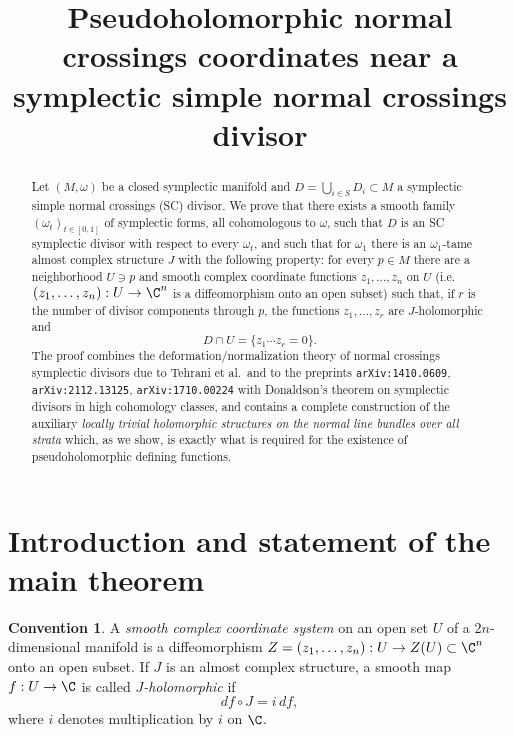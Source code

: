 \documentclass[11pt]{amsart}
\theoremstyle{plain}
\theoremstyle{definition}
\newtheorem{convention}[theorem]{Convention}
\begin{document}
\title{Pseudoholomorphic normal crossings coordinates near a
symplectic simple normal crossings divisor}

\author{}
\date{}

\maketitle

\begin{abstract}
Let $(M,\omega)$ be a closed symplectic manifold and $D=\bigcup_{i\in S}D_i
\subset M$ a symplectic simple normal crossings (SC) divisor. We prove that
there exists a smooth family $(\omega_t)_{t\in[0,1]}$ of symplectic forms, all
cohomologous to $\omega$, such that $D$ is an SC symplectic divisor with
respect to every $\omega_t$, and such that for $\omega_1$ there is an
$\omega_1$-tame almost complex structure $J$ with the following property: for
every $p\in M$ there are a neighborhood $U\ni p$ and smooth complex coordinate
functions $z_1,\dots,z_n$ on $U$ (i.e.\ $(z_1,\dots,z_n):U\to\C^n$ is a
diffeomorphism onto an open subset) such that, if $r$ is the number of divisor
components through $p$, the functions $z_1,\dots,z_r$ are $J$-holomorphic and
\[
 D\cap U=\{z_1\cdots z_r=0\}.
\]
The proof combines the deformation/normalization theory of normal crossings
symplectic divisors due to Tehrani et al.\ and to the preprints
\texttt{arXiv:1410.0609}, \texttt{arXiv:2112.13125}, \texttt{arXiv:1710.00224}
with Donaldson's theorem on symplectic divisors in high cohomology classes,
and contains a complete construction of the auxiliary
\emph{locally trivial holomorphic structures on the normal line bundles over
all strata} which, as we show, is exactly what is required for the existence
of pseudoholomorphic defining functions.
\end{abstract}

\section{Introduction and statement of the main theorem}

\begin{convention}
A \emph{smooth complex coordinate system} on an open set $U$ of a
$2n$-dimensional manifold is a diffeomorphism $Z=(z_1,\dots,z_n):U\to Z(U)\subset
\C^n$ onto an open subset. If $J$ is an almost complex structure, a smooth map
$f:U\to \C$ is called \emph{$J$-holomorphic} if
\[
 df\circ J=i\,df ,
\]
where $i$ denotes multiplication by $i$ on $\C$.
\end{convention}
\end{document}
